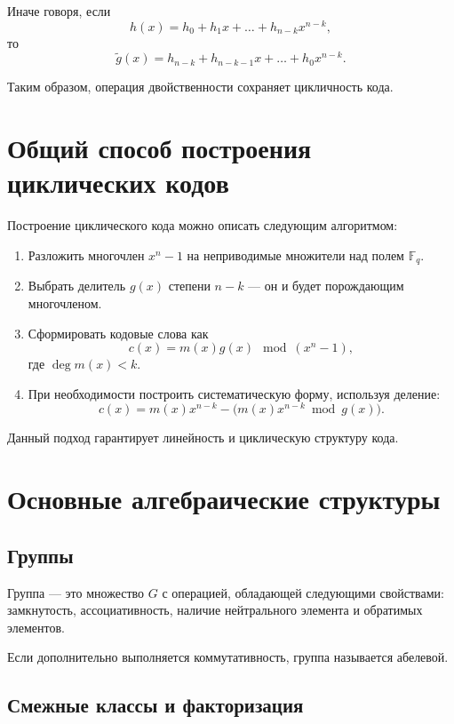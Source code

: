 \documentclass[a4paper,12pt]{article}
\begin{document}
Иначе говоря, если
\[
h(x) = h_0 + h_1 x + \dots + h_{n-k} x^{n-k},
\]
то
\[
\tilde{g}(x) = h_{n-k} + h_{n-k-1}x + \dots + h_0 x^{n-k}.
\]

Таким образом, операция двойственности сохраняет цикличность кода.

\section{Общий способ построения циклических кодов}

Построение циклического кода можно описать следующим алгоритмом:

\begin{enumerate}
    \item Разложить многочлен $x^n - 1$ на неприводимые множители над полем $\mathbb{F}_q$.
    
    \item Выбрать делитель $g(x)$ степени $n - k$ — он и будет порождающим многочленом.
    
    \item Сформировать кодовые слова как
    \[
    c(x) = m(x)g(x) \mod (x^n - 1),
    \]
    где $\deg m(x) < k$.
    
    \item При необходимости построить систематическую форму, используя деление:
    \[
    c(x) = m(x)x^{n-k} - \big(m(x)x^{n-k} \bmod g(x)\big).
    \]
\end{enumerate}

Данный подход гарантирует линейность и циклическую структуру кода.

\section{Основные алгебраические структуры}

\subsection{Группы}

Группа — это множество $G$ с операцией, обладающей следующими свойствами:
замкнутость, ассоциативность, наличие нейтрального элемента и обратимых элементов.

Если дополнительно выполняется коммутативность, группа называется абелевой.

\subsection{Смежные классы и факторизация}
\end{document}
